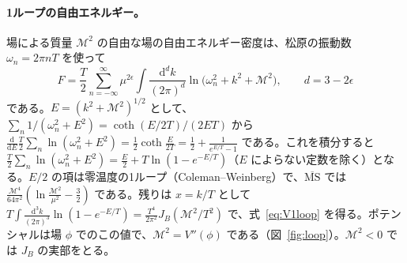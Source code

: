 \documentclass[a4paper,10pt]{ltjsarticle}
\newcommand{\dd}{\mathrm{d}}
\begin{document}
\paragraph{1ループの自由エネルギー。}場による質量 $\mathcal M^2$ の自由な場の自由エネルギー密度は、松原の振動数 $\omega_n=2\pi nT$ を使って
\begin{equation*}
F=\frac T2\sum_{n=-\infty}^\infty\mu^{2\epsilon}\int\frac{\dd^dk}{(2\pi)^d}\ln\bigl(\omega_n^2+k^2+\mathcal M^2\bigr),\qquad d=3-2\epsilon
\end{equation*}
である。$E=(k^2+\mathcal M^2)^{1/2}$ として、$\sum_n1/(\omega_n^2+E^2)=\coth(E/2T)/(2ET)$ から $\frac{\dd}{\dd E}\frac T2\sum_n\ln(\omega_n^2+E^2)=\frac12\coth\frac E{2T}=\frac12+\frac1{e^{E/T}-1}$ である。これを積分すると $\frac T2\sum_n\ln(\omega_n^2+E^2)=\frac E2+T\ln(1-e^{-E/T})$（$E$ によらない定数を除く）となる。$E/2$ の項は零温度の1ループ（Coleman–Weinberg）で、$\overline{\mathrm{MS}}$ では $\frac{\mathcal M^4}{64\pi^2}(\ln\frac{\mathcal M^2}{\mu^2}-\frac32)$ である。残りは $x=k/T$ として $T\int\frac{\dd^3k}{(2\pi)^3}\ln(1-e^{-E/T})=\frac{T^4}{2\pi^2}J_B(\mathcal M^2/T^2)$ で、式~\eqref{eq:V1loop} を得る。ポテンシャルは場 $\phi$ でのこの値で、$\mathcal M^2=V''(\phi)$ である（図~\ref{fig:loop}）。$\mathcal M^2<0$ では $J_B$ の実部をとる。
\end{document}
